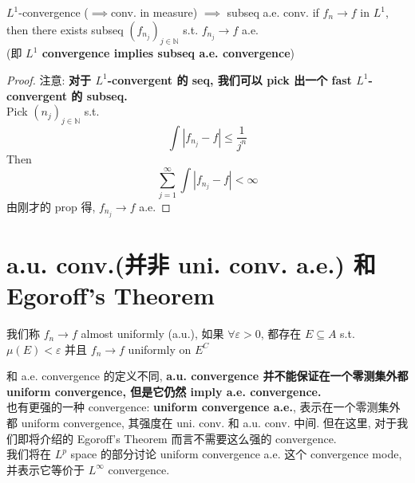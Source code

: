 \documentclass[lang=cn,11pt]{elegantbook}
\begin{document}
\begin{corollary}{$L^1$-convergence ($\implies$conv. in measure) $\implies$ subseq a.e. conv. }
    if $f_n \rightarrow f$ in $L^1$, then there exists subseq $(f_{n_j})_{j\in \mathbb{N}}$ s.t. $f_{n_j} \rightarrow f$ a.e. \\
    (即 \textbf{$L^1$ convergence implies subseq a.e. convergence})
\end{corollary}
\begin{proof}
    注意: \textbf{对于 $L^1$-convergent 的 seq, 我们可以 pick 出一个 fast $L^1$-convergent 的 subseq.}\\
    Pick $(n_j)_{j\in\mathbb{N}}$ s.t. 
    \[
    \int |f_{n_j} - f| \leq \frac{1}{j^n}
    \]
    Then \[
    \sum_{j=1}^\infty \int |f_{n_j}-f| < \infty
    \]
    由刚才的 prop 得, $f_{n_j}\rightarrow f$ a.e.
\end{proof}
  \begin{comment}
\begin{remark}
这里直接证明了 $L^1$-convergence $\implies$ subseq a.e. conv, 而我们也可以\textbf{在中间加上 conv. in measure }这一过渡.\\
我们可以通过\[ \mu(B_{n,k}^c)  \leq k \int |f_n-f|\] 的关系, 加上 $L^1$-convergence 对这个积分的控制, 简单得到 \textbf{$L^1$ convergent implies convergent in measure}.\\
至于 convergent in measure 证明 subseq a.e. conv, 这一部分在 Folland 2.30. \textbf{Convergent in measure implies Cauchy in measure, and Cauchy in measure implies subseq a.e. conv.} (这个证明看起来还挺麻烦的.)
  
    我们取一个 subseq $(g_j) := (f_{n_j})$, 其满足 \[
    \mu( E_j := \{x: |g_j(x)- g_{j+1} (x) | \geq \frac{1}{2^j}\}) \leq \frac{1}{2^j} 
    \]

\end{remark}
\end{comment}




\section{a.u. conv.(并非 uni. conv. a.e.) 和 Egoroff's Theorem}
\begin{definition}
    我们称 $f_n\rightarrow f$ almost uniformly (a.u.), 如果 $\forall \varepsilon > 0$, 都存在 $E \subseteq A$ s.t. $\mu(E) < \varepsilon$ 并且 $f_n \rightarrow f$ uniformly on $E^C$
\end{definition}
\begin{remark}
    和 a.e. convergence 的定义不同, \textbf{a.u. convergence 并不能保证在一个零测集外都 uniform convergence, 但是它仍然 imply a.e. convergence.}\\
    也有更强的一种 convergence: \textbf{uniform convergence a.e.}, 表示在一个零测集外都 uniform convergence, 其强度在 uni. conv. 和 a.u. conv. 中间. 但在这里, 对于我们即将介绍的 Egoroff's Theorem 而言不需要这么强的 convergence. \\
    我们将在 $L^p$ space 的部分讨论 uniform convergence a.e. 这个 convergence mode, 并表示它等价于 $L^\infty$ convergence.
\end{remark}
\end{document}
